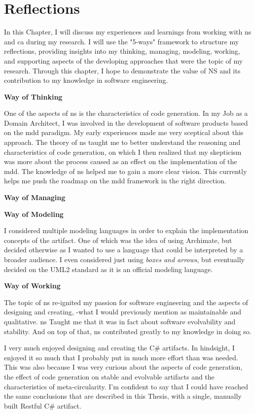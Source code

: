 \chapter{Reflections}

In this Chapter, I will discuss my experiences and learnings from working with \gls{ns}
and \gls{ca} during my research. I will use the "5-ways" framework to structure my
reflections, providing insights into my thinking, managing, modeling, working, and
supporting aspects of the developing approaches that were the topic of my research.
Through this chapter, I hope to demonstrate the value of NS and its contribution to my
knowledge in software engineering.

\textbf{Way of Thinking}

One of the aspects of \gls{ns} is the characteristics of code generation. In my Job as a
Domain Architect, I was involved in the development of software products based on the
\gls{mdd} paradigm. My early experiences made me very sceptical about this approach. The
theory of \gls{ns} taught me to better understand the reasoning and characteristics of
code generation, on which I then realized that my skepticism was more about the process
caused as an effect on the implementation of the \gls{mdd}. The knowledge of \gls{ns}
helped me to gain a more clear vision. This currently helps me push the roadmap on the
\gls{mdd} framework in the right direction.

\textbf{Way of Managing}


\textbf{Way of Modeling}

I considered multiple modeling languages in order to explain the implementation concepts
of the artifact. One of which was the idea of using Archimate, but decided otherwise as I
wanted to use a language that could be interpreted by a broader audience. I even
considered just using \emph{boxes and arrows}, but eventually decided on the UML2 standard
as it is an official modeling language.

\textbf{Way of Working}

The topic of \gls{ns} re-ignited my passion for software engineering and the aspects of
designing and creating, -what I would previously mention as maintainable and qualitative.
\gls{ns} Taught me that it was in fact about software evolvability and stability. And on
top of that, \gls{ns} contributed greatly to my knowledge in doing so.

I very much enjoyed designing and creating the C\# artifacts. In hindsight, I enjoyed it
so much that I probably put in much more effort than was needed. This was also because I
was very curious about the aspects of code generation, the effect of code generation on
stable and evolvable artifacts and the characteristics of meta-circularity. I'm confident
to say that I could have reached the same conclusions that are described in this Thesis,
with a single, manually built Restful C\# artifact.

